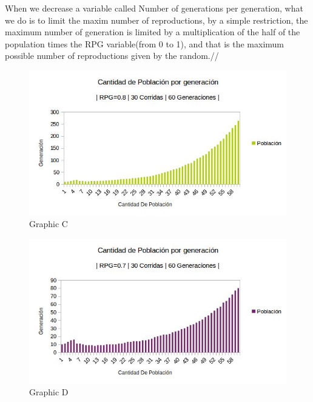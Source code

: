 \documentclass[twocolumn]{IEEEtran}
\begin{document}
\begin{enumerate}
When we decrease a variable called Number of generations per generation, what we do is to limit the maxim number of reproductions, by a simple restriction, the maximum number of generation is limited by a multiplication of the half of the population times the RPG variable(from 0 to 1), and that is the maximum possible number of reproductions given by the random.//   
    \begin{figure}[h!]
    \centering
    \includegraphics[width=\columnwidth]{src/rpg0_8.jpg}
	\caption{Graphic C}
    \label{fig:TESTRPG0.8}
    \end{figure}
    
    \begin{figure}[h!]
    \centering
    \includegraphics[width=\columnwidth]{src/rpg0_7.jpg}
	\caption{Graphic D}
    \label{fig:TESTRPG0.7}
    \end{figure}
    

\end{enumerate}
\end{document}
